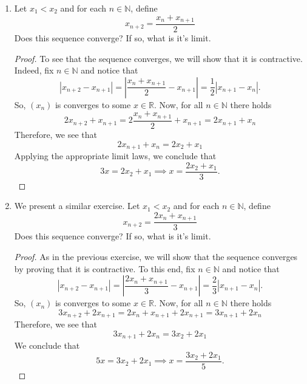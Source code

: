 \documentclass[12pt, reqno]{article}
\numberwithin{equation}{section}
\theoremstyle{definition}
\theoremstyle{remark}
\newcommand{\NN}{\mathbb{N}}
\newcommand{\RR}{\mathbb{R}}
\newcommand{\abs}[1]{\left\lvert#1\right\rvert}
\begin{document}
\begin{enumerate}[leftmargin=*]
\begin{proof}
		      (c) Since contractive sequences converge, we deduce that $x_n \to x$ for some $x\in \RR$. Recalling that
		      \[
			      x_{n+1} = \frac{1}{2+x_n},
			      \quad\text{and}\quad
			      x_n > 0
		      \]
		      for all $n\in\NN$, we may apply the limit laws (Theorem 3.23) in the textbook to deduce that
		      \[
			      x = \frac{1}{2+x} \implies x^2 + 2x -1 = 0
		      \]
		      Therefore, the only possible values for $x$ are $\sqrt{2} - 1$ and $-\sqrt{2} - 1$. Finally, since $x_n >0$ for all $n\in\NN$, we see that $x$ must be equal to $\sqrt{2} - 1$.
	      \end{proof}

	\item Let $x_1 < x_2$ and for each $n \in \NN$, define
	      \[
		      x_{n+2} = \frac{x_n + x_{n+1}}{2}
	      \]
	      Does this sequence converge? If so, what is it's limit.

	      \begin{proof}
		      To see that the sequence converges, we will show that it is contractive. Indeed, fix $n\in \NN$ and notice that
		      \[
			      \abs{x_{n+2} - x_{n+1}} = \abs{\frac{x_n + x_{n+1}}{2} - x_{n+1}} = \frac{1}{2} \abs{x_{n+1} - x_n}.
		      \]
		      So, $(x_n)$ is converges to some $x\in \RR$. Now, for all $n\in \NN$ there holds
		      \[
			      2x_{n+2} + x_{n+1} = 2\frac{x_n + x_{n+1}}{2} + x_{n+1} = 2x_{n+1} + x_n
		      \]
		      Therefore, we see that
		      \[
			      2x_{n+1} + x_n = 2x_2+x_1
		      \]
		      Applying the appropriate limit laws, we conclude that
		      \[
			      3x = 2{x_2} + x_1
			      \implies x = \frac{2x_2 + x_1}{3}.
		      \]
	      \end{proof}

	\item We present a similar exercise. Let $x_1 < x_2$ and for each $n \in \NN$, define
	      \[
		      x_{n+2} = \frac{2x_n + x_{n+1}}{3}
	      \]
	      Does this sequence converge? If so, what is it's limit.

	      \begin{proof}
		      As in the previous exercise, we will show that the sequence converges by proving that it is contractive. To this end, fix $n\in \NN$ and notice that
		      \[
			      \abs{x_{n+2} - x_{n+1}} = \abs{\frac{2x_n + x_{n+1}}{3} - x_{n+1}} = \frac{2}{3} \abs{x_{n+1} - x_n}.
		      \]
		      So, $(x_n)$ is converges to some $x\in \RR$. Now, for all $n\in \NN$ there holds
		      \[
			      3x_{n+2} + 2x_{n+1} = 2x_n + x_{n+1} + 2x_{n+1} = 3x_{n+1} + 2x_n
		      \]
		      Therefore, we see that
		      \[
			      3x_{n+1} + 2x_n = 3x_2+2x_1
		      \]
		      We conclude that
		      \[
			      5x = 3{x_2} + 2x_1
			      \implies x = \frac{3x_2 + 2x_1}{5}.
		      \]
	      \end{proof}

\end{enumerate}
\end{document}
